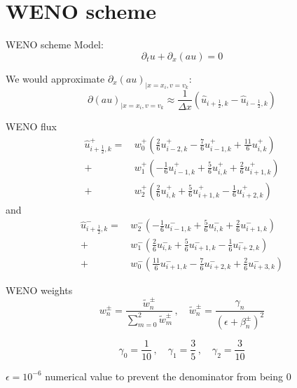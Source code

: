 \documentclass{beamer}
\begin{document}
  \section{WENO scheme}
  \begin{frame}{WENO scheme}
  Model:
	$$
	  \partial_t u + \partial_x(a u) = 0
	$$

	We would approximate $\partial_x(au)_{|x=x_i,v=v_k}$:
	$$
	  \partial(au)_{|x=x_i,v=v_k} \approx \frac{1}{\Delta x}(\hat{u}_{i+\frac{1}{2},k} - \hat{u}_{i-\frac{1}{2},k})
	$$

  \end{frame}
  \begin{frame}{WENO flux}
	$$
	  \begin{aligned}
	    \hat{u}_{i+\frac{1}{2},k}^+ =\,&w_0^+\left(\frac{2}{6}u_{i-2,k}^+ - \frac{7}{6}u_{i-1,k}^+ + \frac{11}{6}u_{i,k}^+\right) \\
	                        +\,&w_1^+\left(-\frac{1}{6}u_{i-1,k}^+ + \frac{5}{6}u_{i,k}^+   +  \frac{2}{6}u_{i+1,k}^+\right) \\
	                        +\,&w_2^+\left( \frac{2}{6}u_{i,k}^+   + \frac{5}{6}u_{i+1,k}^+ -  \frac{1}{6}u_{i+2,k}^+\right)
	  \end{aligned}
	$$
	and
	$$
	  \begin{aligned}
	  \hat{u}_{i+\frac{1}{2},k}^- =\,&w_2^-\left(-\frac{1}{6}u_{i-1,k}^- + \frac{5}{6}u_{i,k}^-   + \frac{2}{6}u_{i+1,k}^-\right) \\
	                        +\,&w_1^-\left( \frac{2}{6}u_{i,k}^-   + \frac{5}{6}u_{i+1,k}^- - \frac{1}{6}u_{i+2,k}^-\right) \\
	                        +\,&w_0^-\left(\frac{11}{6}u_{i+1,k}^- - \frac{7}{6}u_{i+2,k}^- + \frac{2}{6}u_{i+3,k}^-\right)
	  \end{aligned}
	$$
  \end{frame}
  \begin{frame}{WENO weights}
	$$
	  w_{n}^{\pm} = \frac{\tilde{w}_{n}^{\pm}}{\sum_{m=0}^2 \tilde{w}_{m}^{\pm} } \,, \quad \tilde{w}_{n}^{\pm} = \frac{\gamma_n}{(\epsilon + \beta_{n}^{\pm})^2}
	$$

	$$
	  \gamma_{0} = \frac{1}{10} \,, \quad \gamma_{1} = \frac{3}{5}\,,\quad \gamma_{2} = \frac{3}{10}
	$$

	$\epsilon = 10^{-6}$ numerical value to prevent the denominator from being $0$
  \end{frame}
\end{document}

